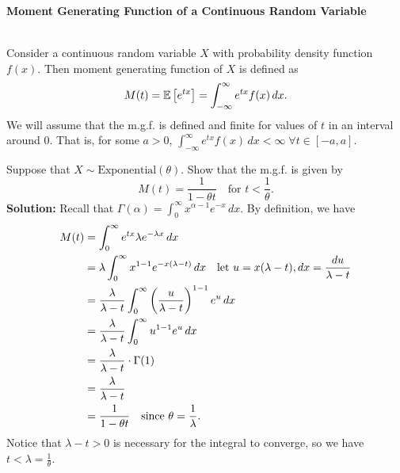 \pagebreak

\textbf{Moment Generating Function of a Continuous Random Variable}

\begin{definition}
    \phantom{}\\
    Consider a continuous random variable $X$ with probability density function $f(x)$. Then moment generating function of $X$ is defined as
    \vspace{-3mm}
    \[
        M(t) = \mathbb{E}\left[{e^{tx}}\right] = \displaystyle \int_{-\infty}^{\infty} e^{tx} f(x) \, dx.
    \]
    We will assume that the m.g.f. is defined and finite for values of $t$ in an interval around 0. That is, for some $a > 0$, $\displaystyle \int_{-\infty}^{\infty} e^{tx} f(x) \, dx < \infty \; \forall t \in [-a,a]$.
\end{definition}

\begin{example}
    Suppose that $X \sim \text{Exponential}(\theta)$. Show that the m.g.f. is given by \vspace{-3mm}
    \[
        M(t) = \frac{1}{1 - \theta t} \quad \text{for $t < \frac{1}{\theta}$}.
    \]
    \textbf{Solution:} Recall that $\Gamma(\alpha) = \displaystyle \int_{0}^{\infty} x^{\alpha -1} e^{-x} \, dx$. By definition, we have \vspace{-3mm}
    \begin{align*}
        M(t) &= \displaystyle \int_{0}^{\infty} e^{tx} \lambda e^{-\lambda x} \, dx \\
        &= \lambda \displaystyle \int_{0}^{\infty} x^{1-1} e^{-x(\lambda - t)} \, dx \quad \text{let $u = x(\lambda - t)$}, dx = \frac{du}{\lambda - t} \\
        &= \displaystyle \frac{\lambda}{\lambda - t} \displaystyle \int_{0}^{\infty} \left( \frac{u}{\lambda - t} \right)^{1-1} e^u \, dx \\
        &= \displaystyle \frac{\lambda}{\lambda - t} \displaystyle \int_{0}^{\infty} u^{1-1} e^u \, dx \\
        &= \displaystyle \frac{\lambda}{\lambda - t} \cdot \Gamma(1) \\
        &= \displaystyle \frac{\lambda}{\lambda - t} \\
        &= \displaystyle \frac{1}{1 - \theta t} \quad \text{since $\theta = \frac{1}{\lambda}$}.
    \end{align*}
    Notice that $\lambda - t > 0$ is necessary for the integral to converge, so we have $t < \lambda = \frac{1}{\theta}$.
\end{example}

